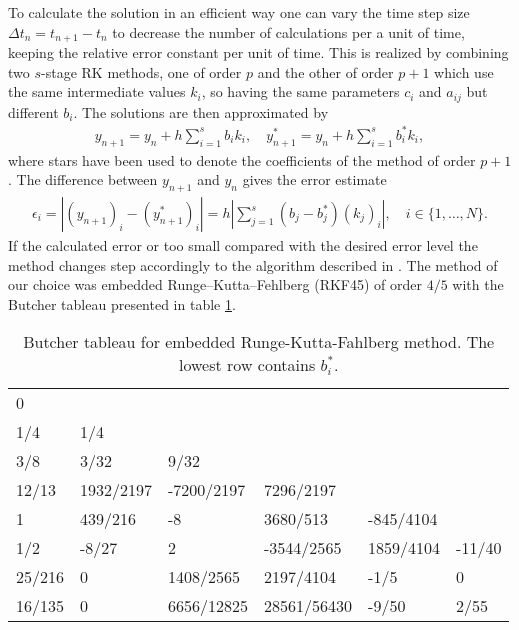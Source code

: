 To calculate the solution in an efficient way one can vary the time
step size $\Delta t_n=t_{n+1}-t_{n}$ to decrease the number of
calculations per a unit of time, keeping the relative error constant
per unit of time. This is realized by combining two $s$-stage RK
methods, one of order $p$ and the other of order $p+1$ which use the
same intermediate values $k_i$, so having the same parameters $c_i$
and $a_{ij}$ but different $b_i$. The solutions are then approximated
by
\begin{align}
  \label{eq:105}
  y_{n+1}=y_n+h\sum_{i=1}^s b_i k_i,\quad y_{n+1}^*=y_n+h\sum_{i=1}^s
  b^*_i k_i,
\end{align}
where stars have been used to denote the coefficients of the method of
order $p+1$. The difference between $y_{n+1}$ and $y_{n}$ gives the
error estimate
\begin{align}
  \label{eq:106}
  \epsilon_i=|(y_{n+1})_i-(y_{n+1}^*)_i|=h\left|\sum_{j=1}^s(b_j-b_j^*)(k_j)_i\right|,\quad
  i\in\{1,\dots,N\}.
\end{align}
If the calculated error or too small compared with the desired error
level the method changes step accordingly to the algorithm described
in \cite{Galassi}. The method of our choice was embedded
Runge–Kutta–Fehlberg (RKF45) of order $4/5$ with the Butcher tableau
presented in table \ref{tab:rkf45}.

\begin{table}[h]
  \centering
  \begin{tabular}{l|lllll}
    0      &           &            &             &           &        \\
    1/4    & 1/4       &            &             &           &        \\
    3/8    & 3/32      & 9/32       &             &           &        \\
    12/13  & 1932/2197 & -7200/2197 & 7296/2197   &           &        \\
    1      & 439/216   & -8         & 3680/513    & -845/4104 &        \\
    1/2    & -8/27     & 2          & -3544/2565  & 1859/4104 & -11/40 \\\hline
    25/216 & 0         & 1408/2565  & 2197/4104   & -1/5      & 0      \\
    16/135 & 0         & 6656/12825 & 28561/56430 & -9/50     & 2/55
  \end{tabular}
  \caption{Butcher tableau for embedded Runge-Kutta-Fahlberg
    method. The lowest row contains $b_i^*$.}
  \label{tab:rkf45}
\end{table}



